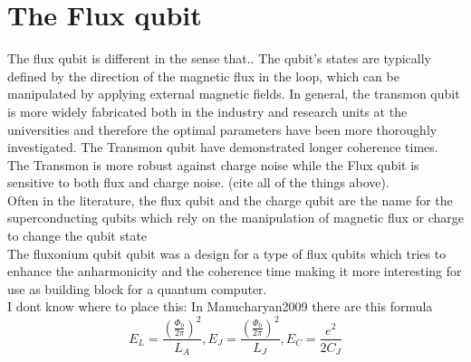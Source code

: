 \section{The Flux qubit}
    The flux qubit is different in the sense that.. The qubit's states are typically defined by the direction of the magnetic flux in the loop, which can be manipulated by applying external magnetic fields.
    In general, the transmon qubit is more widely fabricated both in the industry and research units at the universities and therefore the optimal parameters have been more thoroughly investigated. The Transmon qubit have demonstrated longer coherence times. The Transmon is more robust against charge noise while the Flux qubit is sensitive to both flux and charge noise. (cite all of the things above).
    \\ 
    Often in the literature, the flux qubit and the charge qubit are the name for the superconducting qubits which rely on the manipulation of magnetic flux or charge to change the qubit state
    \\
    The fluxonium qubit qubit was a design for a type of flux qubits which tries to enhance the anharmonicity and the coherence time making it more interesting for use as building block for a quantum computer. 
    \\
    I dont know where to place this: In Manucharyan2009 \Cite{Manucharyan2009} there are this formula
    \begin{equation}
        E_L = \frac{(\frac{\Phi_0}{2 \pi})^2}{L_A}, E_J =\frac{(\frac{\Phi_0}{2 \pi})^2}{L_J}, E_C = \frac{e^2}{2C_J} 
    \end{equation}
    

